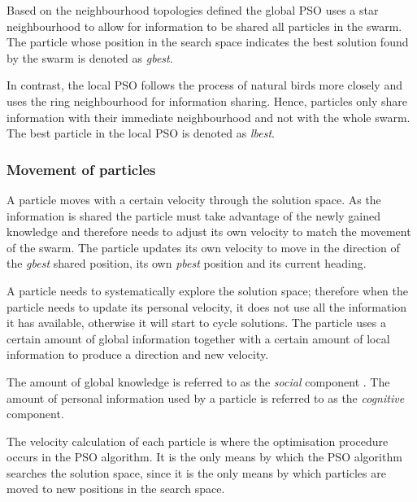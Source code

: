 Based on the neighbourhood topologies defined the global PSO uses a star neighbourhood to allow for information to be shared all particles in the swarm. The particle whose position in the search space indicates the best solution found by the swarm is denoted as \emph{gbest}\cite{SOSwarm, FundamentalSwarm, CompuIntelligenceIntro}. 

In contrast, the local PSO follows the process of natural birds more closely and uses the ring neighbourhood for information sharing\cite{SOSwarm, FundamentalSwarm, CompuIntelligenceIntro}. Hence, particles only share information with their immediate neighbourhood and not with the whole swarm. The best particle in the local PSO is denoted as \emph{lbest}\cite{SOSwarm, FundamentalSwarm, CompuIntelligenceIntro}.

\subsubsection{Movement of particles}
\label{sec:particleVelocity}
A particle moves with a certain velocity through the solution space. As the information is shared the particle must take advantage of the newly gained knowledge and therefore needs to adjust its own velocity to match the movement of the swarm. The particle updates its own velocity to move in the direction of the \emph{gbest} shared position, its own \emph{pbest} position and its current heading.

A particle needs to systematically explore the solution space; therefore when the particle needs to update its personal velocity, it does not use all the information it has available, otherwise it will start to cycle solutions. The particle uses a certain amount of global information together with a certain amount of local information to produce a direction and new velocity\cite{FundamentalSwarm,CompuIntelligenceIntro,PSOSelfHierarch,SOSwarm}. 

The amount of global knowledge is referred to as the \emph{social} \label{def:socialcomponent} component \cite{FundamentalSwarm,CompuIntelligenceIntro,PSOSelfHierarch,SOSwarm}. The amount of personal information used by a particle is referred to as the \emph{cognitive} \label{def:cognitivecomponent} component\cite{FundamentalSwarm,CompuIntelligenceIntro,PSOSelfHierarch,SOSwarm}.

The velocity calculation of each particle is where the optimisation procedure occurs in the PSO algorithm. It is the only means by which the PSO algorithm searches the solution space, since it is the only means by which particles are moved to new positions in the search space\cite{CompuIntelligenceIntro}.

